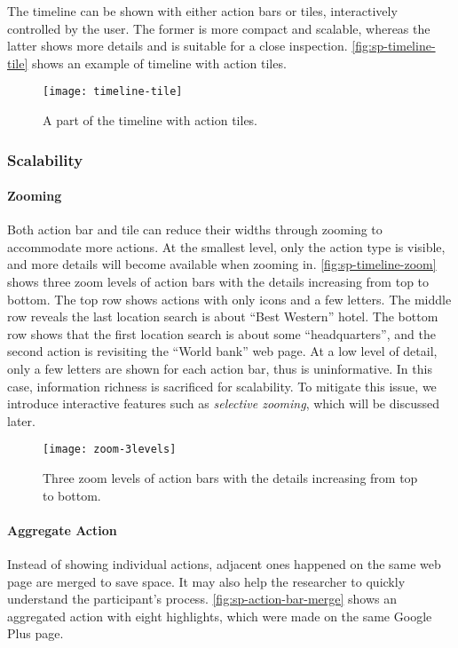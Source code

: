 The timeline can be shown with either action bars or tiles, interactively controlled by the user. The former is more compact and scalable, whereas the latter shows more details and is suitable for a close inspection. \autoref{fig:sp-timeline-tile} shows an example of timeline with action tiles.

\begin{figure}[!htb]
\centering
\texttt{[image: timeline-tile]}
\caption{A part of the timeline with action tiles.}
\label{fig:sp-timeline-tile}
\end{figure}

\subsubsection{Scalability}
\paragraph{Zooming}
Both action bar and tile can reduce their widths through zooming to accommodate more actions. At the smallest level, only the action type is visible, and more details will become available when zooming in. \autoref{fig:sp-timeline-zoom} shows three zoom levels of action bars with the details increasing from top to bottom. The top row shows actions with only icons and a few letters. The middle row reveals the last location search is about ``Best Western'' hotel. The bottom row shows that the first location search is about some ``headquarters'', and the second action is revisiting the ``World bank'' web page. At a low level of detail, only a few letters are shown for each action bar, thus is uninformative. In this case, information richness is sacrificed for scalability. To mitigate this issue, we introduce interactive features such as \emph{selective zooming}, which will be discussed later.

\begin{figure}[!htb]
\centering
\texttt{[image: zoom-3levels]}
\caption{Three zoom levels of action bars with the details increasing from top to bottom.}
\label{fig:sp-timeline-zoom}
\end{figure}

\paragraph{Aggregate Action}
Instead of showing individual actions, adjacent ones happened on the same web page are merged to save space. It may also help the researcher to quickly understand the participant's process. \autoref{fig:sp-action-bar-merge} shows an aggregated action with eight highlights, which were made on the same Google Plus page.

